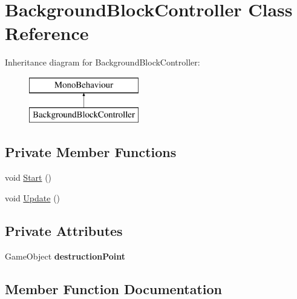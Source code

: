 \hypertarget{class_background_block_controller}{}\section{Background\+Block\+Controller Class Reference}
\label{class_background_block_controller}
Inheritance diagram for Background\+Block\+Controller\+:\begin{figure}[H]
\begin{center}
\leavevmode
\includegraphics[height=2.000000cm]{class_background_block_controller}
\end{center}
\end{figure}
\subsection*{Private Member Functions}
\begin{DoxyCompactItemize}
\item 
void \mbox{\hyperlink{class_background_block_controller_ae1d3c9217fcce2a7b3cdfe84f048666d}{Start}} ()
\item 
void \mbox{\hyperlink{class_background_block_controller_ae7da09ef0091eccbce560affdccef96b}{Update}} ()
\end{DoxyCompactItemize}
\subsection*{Private Attributes}
\begin{DoxyCompactItemize}
\item 
\mbox{\label{class_background_block_controller_ae47dde7e03c849a1d47584ffbabcd8d1}} 
Game\+Object {\bfseries destruction\+Point}
\end{DoxyCompactItemize}


\subsection{Member Function Documentation}
\mbox{\label{class_background_block_controller_ae1d3c9217fcce2a7b3cdfe84f048666d}} 
